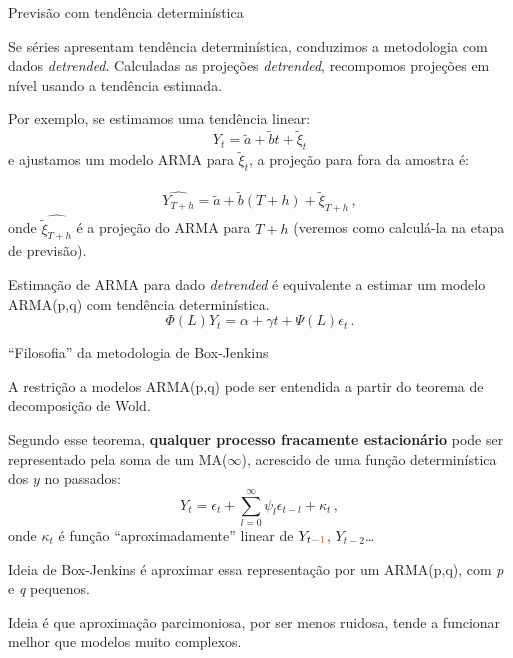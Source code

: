 \documentclass[11pt]{beamer}
\newenvironment{halfwideitemize}{\itemize\addtolength{\itemsep}{0.5em}}{\enditemize}
\begin{document}
\begin{frame}{Previsão com tendência determinística}
	\begin{halfwideitemize}
				\item Se séries apresentam tendência determinística, conduzimos a metodologia com dados \textit{detrended}. Calculadas as projeções \textit{detrended}, recompomos projeções em nível usando a tendência estimada.
				
				\item Por exemplo, se estimamos uma tendência linear:
				$$Y_t = \tilde{a} + \tilde{b}t + \tilde{\xi}_t$$
				e ajustamos um modelo ARMA  para $\tilde{\xi}_t$, a projeção para fora da amostra é:
				
				$$\widehat{Y_{T+h}} = \tilde{a} + \tilde{b}(T+h) + \widehat{\tilde{\xi}_{T+h}}\, ,$$
				onde $\widehat{\tilde{\xi}_{T+h}}$ é a projeção do ARMA para $T+h$ (veremos como calculá-la na etapa de previsão).
	\item Estimação de ARMA para dado \textit{detrended} é equivalente a estimar um modelo ARMA(p,q) com tendência determinística.
$$\Phi(L) Y_t =  \alpha + \gamma t + \Psi(L)\epsilon_t \, .$$
	\end{halfwideitemize}
\end{frame}

\begin{frame}{``Filosofia'' da metodologia de Box-Jenkins}
	\begin{halfwideitemize}
		\item A restrição a modelos ARMA(p,q) pode ser entendida a partir do {\color{blue}teorema de decomposição de Wold.}
		\item Segundo esse teorema, \textbf{qualquer processo fracamente estacionário} pode ser representado pela soma de um MA($\infty$), acrescido de uma função determinística dos $y$ no passados:
		$$Y_t = \epsilon_t  +\sum_{l=0}^\infty \psi_l \epsilon_{t-l} + \kappa_t \, ,$$
		onde $\kappa_t$ é função ``aproximadamente'' linear de $Y_{t{\color{red}-1}}$, $Y_{t-2}$\ldots 
			\item Ideia de Box-Jenkins é aproximar essa representação por um ARMA(p,q), com \textit{p} e \textit{q} {\color{blue}pequenos}.
		\begin{halfwideitemize}
			\item Ideia é que aproximação {\color{blue}parcimoniosa}, por ser menos ruidosa, tende a funcionar melhor que modelos muito complexos.
		\end{halfwideitemize}	
	\end{halfwideitemize}
\end{frame}
\end{document}
